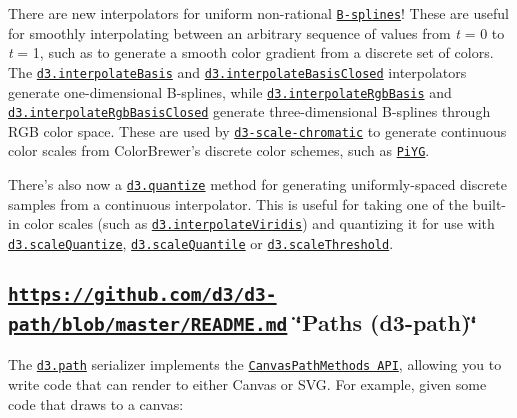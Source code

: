 There are new interpolators for uniform non-\/rational \href{https://en.wikipedia.org/wiki/B-spline}{\tt B-\/splines}! These are useful for smoothly interpolating between an arbitrary sequence of values from {\itshape t} = 0 to {\itshape t} = 1, such as to generate a smooth color gradient from a discrete set of colors. The \href{https://github.com/d3/d3-interpolate/blob/master/README.md#interpolateBasis}{\tt d3.\+interpolate\+Basis} and \href{https://github.com/d3/d3-interpolate/blob/master/README.md#interpolateBasisClosed}{\tt d3.\+interpolate\+Basis\+Closed} interpolators generate one-\/dimensional B-\/splines, while \href{https://github.com/d3/d3-interpolate/blob/master/README.md#interpolateRgbBasis}{\tt d3.\+interpolate\+Rgb\+Basis} and \href{https://github.com/d3/d3-interpolate/blob/master/README.md#interpolateRgbBasisClosed}{\tt d3.\+interpolate\+Rgb\+Basis\+Closed} generate three-\/dimensional B-\/splines through R\+GB color space. These are used by \href{https://github.com/d3/d3-scale-chromatic}{\tt d3-\/scale-\/chromatic} to generate continuous color scales from Color\+Brewer’s discrete color schemes, such as \href{https://bl.ocks.org/mbostock/048d21cf747371b11884f75ad896e5a5}{\tt Pi\+YG}.

There’s also now a \href{https://github.com/d3/d3-interpolate/blob/master/README.md#quantize}{\tt d3.\+quantize} method for generating uniformly-\/spaced discrete samples from a continuous interpolator. This is useful for taking one of the built-\/in color scales (such as \href{https://github.com/d3/d3-scale/blob/master/README.md#interpolateViridis}{\tt d3.\+interpolate\+Viridis}) and quantizing it for use with \href{https://github.com/d3/d3-scale/blob/master/README.md#scaleQuantize}{\tt d3.\+scale\+Quantize}, \href{https://github.com/d3/d3-scale/blob/master/README.md#scaleQuantile}{\tt d3.\+scale\+Quantile} or \href{https://github.com/d3/d3-scale/blob/master/README.md#scaleThreshold}{\tt d3.\+scale\+Threshold}.

\subsection*{\href{https://github.com/d3/d3-path/blob/master/README.md}{\tt https\+://github.\+com/d3/d3-\/path/blob/master/\+R\+E\+A\+D\+M\+E.\+md} \char`\"{}\+Paths (d3-\/path)\char`\"{}}

The \href{https://github.com/d3/d3-path/blob/master/README.md#path}{\tt d3.\+path} serializer implements the \href{https://www.w3.org/TR/2dcontext/#canvaspathmethods}{\tt Canvas\+Path\+Methods A\+PI}, allowing you to write code that can render to either Canvas or S\+VG. For example, given some code that draws to a canvas\+:


